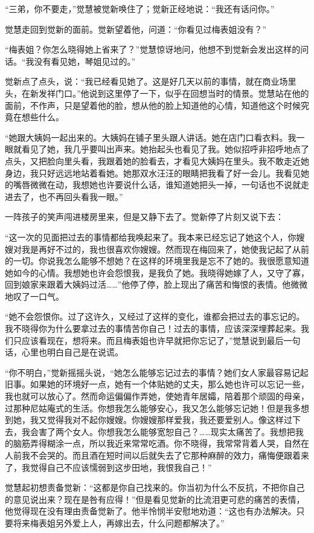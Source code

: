 \par “三弟，你不要走，”觉慧被觉新唤住了；觉新正经地说：“我还有话问你。”
\par 觉慧走回到觉新的面前。觉新望着他，问道：“你看见过梅表姐没有？”
\par “梅表姐？你怎么晓得她上省来了？”觉慧惊讶地问，他想不到觉新会发出这样的问话。“我没有看见她，琴姐见过的。”
\par 觉新点了点头，说：“我已经看见她了。这是好几天以前的事情，就在商业场里头，在新发祥门口。”他说到这里停了一下，似乎在回想当时的情景。觉慧站在他的面前，不作声，只是望着他的脸，想从他的脸上知道他的心情，知道他这个时候究竟在想些什么。
\par “她跟大姨妈一起出来的。大姨妈在铺子里头跟人讲话。她在店门口看衣料。我一眼就看见了她，我几乎要叫出声来。她抬起头也看见了我。她似招呼非招呼地点了点头，又把脸向里头看，我跟着她的脸看去，才看见大姨妈在里头。我不敢走近她身边，我只好远远地站着看她。她那双水汪汪的眼睛把我看了好一会儿。我看见她的嘴唇微微在动，我想她也许要说什么话，谁知道她把头一掉，一句话也不说就走进去了，也不再回头看我一眼。”
\par 一阵孩子的笑声闯进楼房里来，但是又静下去了。觉新停了片刻又说下去：
\par “这一次的见面把过去的事情都给我唤起来了。我本来已经忘记了她这个人，你嫂嫂对我是再好不过的，我也很喜欢你嫂嫂。然而现在梅回来了，她使我记起了从前的一切。你说我怎么能够不想她？在这样的环境里我是忘不了她的。我很愿意知道她如今的心情。我想她也许会怨恨我，是我负了她。我晓得她嫁了人，又守了寡，回到娘家来跟着大姨妈过活……”他停了停，脸上现出了痛苦和悔恨的表情。他微微地叹了一口气。
\par “她不会怨恨你。过了这许久，又经过了这样的变化，谁都会把过去的事忘记的。我不晓得你为什么要拿过去的事情苦你自己！过去的事情，应该深深埋葬起来。我们只应该看现在，想将来。而且梅表姐也许早就把你忘记了，”觉慧说到最后一句话，心里也明白自己是在说谎。
\par “你不明白，”觉新摇摇头说，“她怎么能够忘记过去的事情？她们女人家最容易记起旧事。如果她的环境好一点，她有一个体贴她的丈夫，那么她也许可以忘记一些，我也就可以放心了。然而命运偏偏作弄她，使她青年居孀，陪着那个顽固的母亲，过那种尼姑庵式的生活。你想我怎么能够安心，我又怎么能够忘记她！但是我多想到她，我又觉得我对不起你嫂嫂。你嫂嫂那样爱我，我还要爱别人。像这样过下去，我会害了两个女人。你想我怎么能够宽恕自己？……现实太痛苦了。我想把我的脑筋弄得糊涂一点，所以我近来常常吃酒。你不晓得，我常常背着人哭，自然在人前我不会哭的。而且酒在短时间以后就失去了它那种麻醉的效力，痛悔便跟着来了，我觉得自己不应该懦弱到这步田地，我恨我自己！”
\par 觉慧起初想责备觉新：“这都是你自己找来的。你当初为什么不反抗，不把你自己的意见说出来？现在是咎有应得！”但是看见觉新的比流泪更可悲的痛苦的表情，他觉得现在没有理由责备觉新了。他半怜悯半安慰地劝道：“这也有办法解决。只要将来梅表姐另外爱上人，再嫁出去，什么问题都解决了。”
